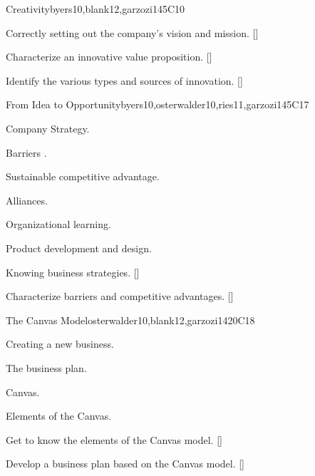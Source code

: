 \begin{syllabus}
\begin{unit}{}{Creativity}{byers10,blank12,garzozi14}{5}{C10}
    \begin{learningoutcomes} 
      \item Correctly setting out the company's vision and mission. [\Usage]
      \item Characterize an innovative value proposition. [\Assessment]
      \item Identify the various types and sources of innovation. [\Familiarity]
    \end{learningoutcomes} 
\end{unit}
   
\begin{unit}{}{From Idea to Opportunity}{byers10,osterwalder10,ries11,garzozi14}{5}{C17}
\begin{topics}
    \item Company Strategy.
    \item Barriers .
    \item Sustainable competitive advantage.
    \item Alliances.
    \item Organizational learning.
    \item Product development and design.
\end{topics}

\begin{learningoutcomes} 
    \item Knowing business strategies. [\Familiarity]
    \item Characterize barriers and competitive advantages. [\Familiarity]
\end{learningoutcomes} 
\end{unit}
   
   \begin{unit}{}{The Canvas Model}{osterwalder10,blank12,garzozi14}{20}{C18}
      \begin{topics}
         \item Creating a new business.
         \item The business plan.
         \item Canvas.
         \item Elements of the Canvas.
      \end{topics}
   
     \begin{learningoutcomes} 
         \item Get to know the elements of the Canvas model. [\Usage]
         \item Develop a business plan based on the Canvas model. [\Usage]
       \end{learningoutcomes} 
   \end{unit}
   

\end{syllabus}
